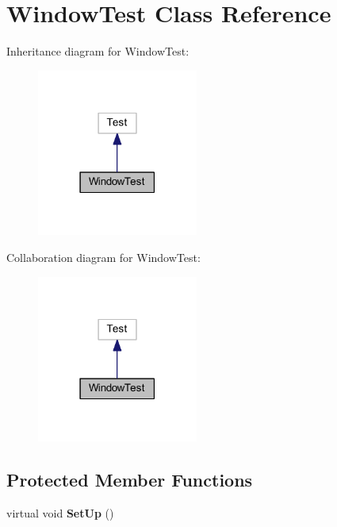 \hypertarget{class_window_test}{}\section{Window\+Test Class Reference}
\label{class_window_test}


Inheritance diagram for Window\+Test\+:\nopagebreak
\begin{figure}[H]
\begin{center}
\leavevmode
\includegraphics[width=150pt]{class_window_test__inherit__graph}
\end{center}
\end{figure}


Collaboration diagram for Window\+Test\+:\nopagebreak
\begin{figure}[H]
\begin{center}
\leavevmode
\includegraphics[width=150pt]{class_window_test__coll__graph}
\end{center}
\end{figure}
\subsection*{Protected Member Functions}
\begin{DoxyCompactItemize}
\item 
\hypertarget{class_window_test_aef877f3405cf0e40a8c7e81fe47c3a7a}{}\label{class_window_test_aef877f3405cf0e40a8c7e81fe47c3a7a} 
virtual void {\bfseries Set\+Up} ()
\end{DoxyCompactItemize}
